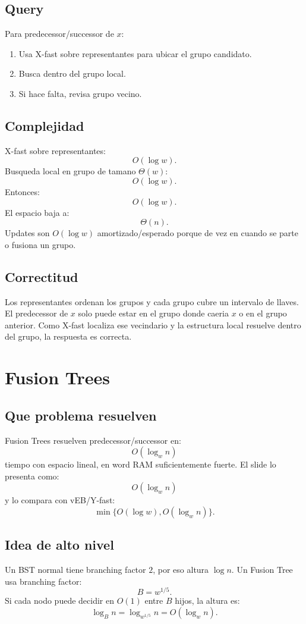 \documentclass[10pt]{article}
\newcommand{\bigO}{O}
\begin{document}
\subsection{Query}
Para predecessor/successor de $x$:
\begin{enumerate}[leftmargin=*]
\item Usa X-fast sobre representantes para ubicar el grupo candidato.
\item Busca dentro del grupo local.
\item Si hace falta, revisa grupo vecino.
\end{enumerate}

\subsection{Complejidad}
X-fast sobre representantes:
\[
\bigO(\log w).
\]
Busqueda local en grupo de tamano $\Theta(w)$:
\[
\bigO(\log w).
\]
Entonces:
\[
\bigO(\log w).
\]
El espacio baja a:
\[
\Theta(n).
\]
Updates son $\bigO(\log w)$ amortizado/esperado porque de vez en cuando se
parte o fusiona un grupo.

\subsection{Correctitud}
Los representantes ordenan los grupos y cada grupo cubre un intervalo de llaves.
El predecessor de $x$ solo puede estar en el grupo donde caeria $x$ o en el
grupo anterior. Como X-fast localiza ese vecindario y la estructura local
resuelve dentro del grupo, la respuesta es correcta.

\newpage
\section{Fusion Trees}

\subsection{Que problema resuelven}
Fusion Trees resuelven predecessor/successor en:
\[
\bigO(\log_w n)
\]
tiempo con espacio lineal, en word RAM suficientemente fuerte. El slide lo
presenta como:
\[
\bigO(\log_w n)
\]
y lo compara con vEB/Y-fast:
\[
\min\{\bigO(\log w),\bigO(\log_w n)\}.
\]

\subsection{Idea de alto nivel}
Un BST normal tiene branching factor $2$, por eso altura $\log n$. Un Fusion
Tree usa branching factor:
\[
B=w^{1/5}.
\]
Si cada nodo puede decidir en $\bigO(1)$ entre $B$ hijos, la altura es:
\[
\log_B n=\log_{w^{1/5}}n=\bigO(\log_w n).
\]
\end{document}
